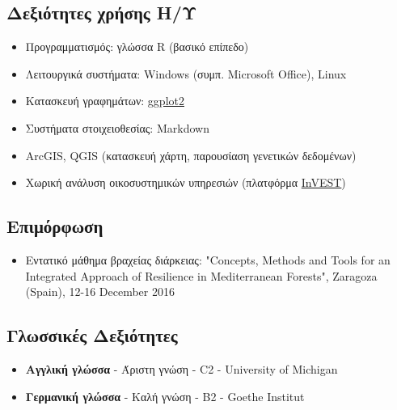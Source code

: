 \documentclass[12pt,]{scrartcl}
\begin{document}
\subsection{Δεξιότητες χρήσης Η/Υ}\label{it}
\begin{itemize}
\vspace{-3mm}
\setlength\itemsep{-0.6em}
\item Προγραμματισμός: γλώσσα R (βασικό επίπεδο)
\item Λειτουργικά συστήματα: Windows (συμπ. Microsoft Office), Linux
\item Κατασκευή γραφημάτων: \href{https://ggplot2.tidyverse.org/}{ggplot2}
\item Συστήματα στοιχειοθεσίας: Markdown
\item ArcGIS, QGIS (κατασκευή χάρτη, παρουσίαση γενετικών δεδομένων)
\item Χωρική ανάλυση οικοσυστημικών υπηρεσιών (πλατφόρμα \href{https://naturalcapitalproject.stanford.edu/invest/}{InVEST})
\end{itemize}

\subsection{Επιμόρφωση}\label{courses}
\begin{itemize}
\vspace{-3mm}
\setlength\itemsep{-0.6em}
\item Εντατικό μάθημα βραχείας διάρκειας: "Concepts, Methods and Tools for an Integrated Approach of Resilience in Mediterranean Forests", Zaragoza (Spain), 12-16 December 2016
\end{itemize}

\subsection{Γλωσσικές Δεξιότητες}\label{Γλώσσες}
\begin{itemize}
\vspace{-3mm}
%
\setlength\itemsep{-0.6em}
\item \textbf{Αγγλική γλώσσα} - Άριστη γνώση - C2 - University of Michigan

\item \textbf{Γερμανική γλώσσα} - Καλή γνώση - Β2 - Goethe Institut
\end{itemize}
\end{document}
